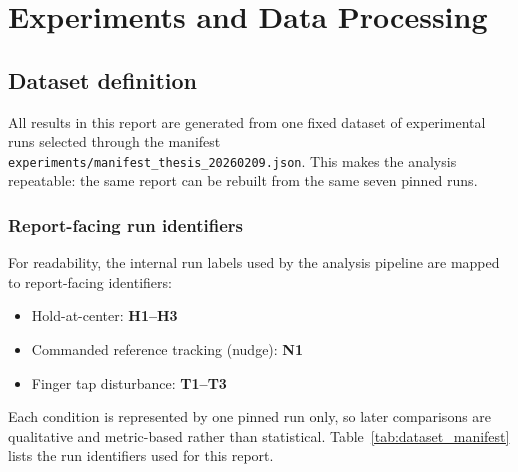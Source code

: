 \chapter{Experiments and Data Processing}
\label{ch:experiments}

\section{Dataset definition}
All results in this report are generated from one fixed dataset of experimental runs selected through the manifest \texttt{experiments/manifest\_thesis\_20260209.json}. This makes the analysis repeatable: the same report can be rebuilt from the same seven pinned runs.

\subsection*{Report-facing run identifiers}
For readability, the internal run labels used by the analysis pipeline are mapped to report-facing identifiers:
\begin{itemize}
  \item Hold-at-center: \textbf{H1--H3}
  \item Commanded reference tracking (nudge): \textbf{N1}
  \item Finger tap disturbance: \textbf{T1--T3}
\end{itemize}
Each condition is represented by one pinned run only, so later comparisons are qualitative and metric-based rather than statistical. Table~\ref{tab:dataset_manifest} lists the run identifiers used for this report.


